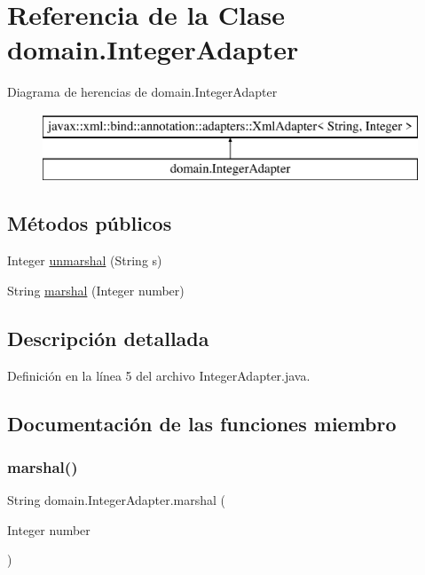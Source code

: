 \hypertarget{classdomain_1_1_integer_adapter}{}\section{Referencia de la Clase domain.\+Integer\+Adapter}
\label{classdomain_1_1_integer_adapter}
Diagrama de herencias de domain.\+Integer\+Adapter\begin{figure}[H]
\begin{center}
\leavevmode
\includegraphics[height=2.000000cm]{classdomain_1_1_integer_adapter}
\end{center}
\end{figure}
\subsection*{Métodos públicos}
\begin{DoxyCompactItemize}
\item 
Integer \mbox{\hyperlink{classdomain_1_1_integer_adapter_ad2bfc5af140573682dd03906b9264b51}{unmarshal}} (String s)
\item 
String \mbox{\hyperlink{classdomain_1_1_integer_adapter_a407b4872b78e54ed80c9ae597cae2451}{marshal}} (Integer number)
\end{DoxyCompactItemize}


\subsection{Descripción detallada}


Definición en la línea 5 del archivo Integer\+Adapter.\+java.



\subsection{Documentación de las funciones miembro}
\mbox{\label{classdomain_1_1_integer_adapter_a407b4872b78e54ed80c9ae597cae2451}} 
\subsubsection{\texorpdfstring{marshal()}{marshal()}}
{\footnotesize\ttfamily String domain.\+Integer\+Adapter.\+marshal (\begin{DoxyParamCaption}\item[{Integer}]{number }\end{DoxyParamCaption})}



